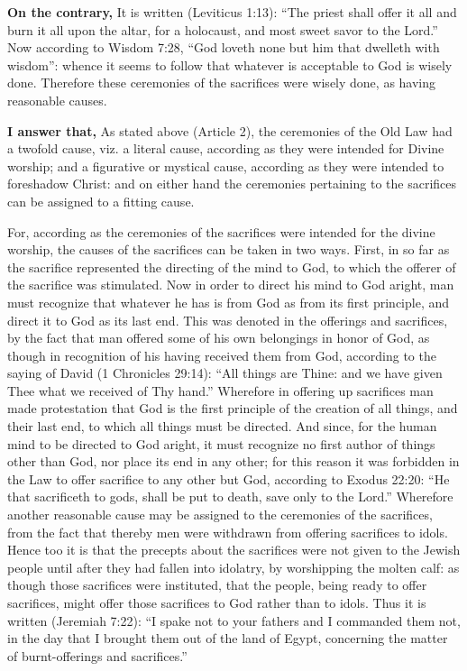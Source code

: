 \textbf{On the contrary,} It is written (Leviticus 1:13): ``The priest shall offer it all and burn it all upon the altar, for a holocaust, and most sweet savor to the Lord.'' Now according to Wisdom 7:28, ``God loveth none but him that dwelleth with wisdom'': whence it seems to follow that whatever is acceptable to God is wisely done. Therefore these ceremonies of the sacrifices were wisely done, as having reasonable causes.

\textbf{I answer that,} As stated above (Article 2), the ceremonies of the Old Law had a twofold cause, viz. a literal cause, according as they were intended for Divine worship; and a figurative or mystical cause, according as they were intended to foreshadow Christ: and on either hand the ceremonies pertaining to the sacrifices can be assigned to a fitting cause.

For, according as the ceremonies of the sacrifices were intended for the divine worship, the causes of the sacrifices can be taken in two ways. First, in so far as the sacrifice represented the directing of the mind to God, to which the offerer of the sacrifice was stimulated. Now in order to direct his mind to God aright, man must recognize that whatever he has is from God as from its first principle, and direct it to God as its last end. This was denoted in the offerings and sacrifices, by the fact that man offered some of his own belongings in honor of God, as though in recognition of his having received them from God, according to the saying of David (1 Chronicles 29:14): ``All things are Thine: and we have given Thee what we received of Thy hand.'' Wherefore in offering up sacrifices man made protestation that God is the first principle of the creation of all things, and their last end, to which all things must be directed. And since, for the human mind to be directed to God aright, it must recognize no first author of things other than God, nor place its end in any other; for this reason it was forbidden in the Law to offer sacrifice to any other but God, according to Exodus 22:20: ``He that sacrificeth to gods, shall be put to death, save only to the Lord.'' Wherefore another reasonable cause may be assigned to the ceremonies of the sacrifices, from the fact that thereby men were withdrawn from offering sacrifices to idols. Hence too it is that the precepts about the sacrifices were not given to the Jewish people until after they had fallen into idolatry, by worshipping the molten calf: as though those sacrifices were instituted, that the people, being ready to offer sacrifices, might offer those sacrifices to God rather than to idols. Thus it is written (Jeremiah 7:22): ``I spake not to your fathers and I commanded them not, in the day that I brought them out of the land of Egypt, concerning the matter of burnt-offerings and sacrifices.''

